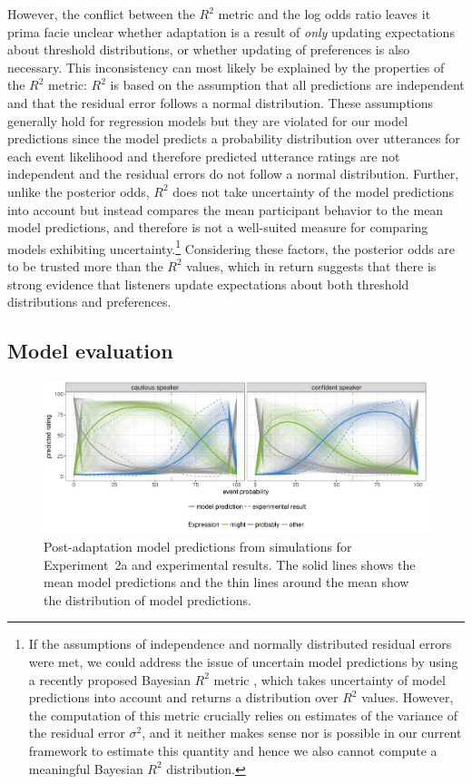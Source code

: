 \documentclass[man, floatsintext]{apa6}
\begin{document}
However, the conflict between the $R^2$ metric and the log odds ratio leaves it prima facie unclear whether adaptation is a result of 
\emph{only} updating expectations about threshold distributions, or whether updating of preferences is also necessary. 
This inconsistency can most likely be explained by the properties of the $R^2$ metric: $R^2$ is based on the assumption that all predictions
are independent and that the residual error follows a normal distribution. These assumptions generally hold for regression models but they are violated
for our model predictions since the model predicts a probability distribution over utterances for each event likelihood and therefore predicted utterance
ratings are not independent and the residual errors do not follow a normal distribution. Further, unlike the posterior odds,
$R^2$ does not take uncertainty of the model predictions into account but instead compares the mean participant behavior to the mean 
model predictions, and therefore is not a well-suited measure for comparing models exhibiting uncertainty.\footnote{If the assumptions of independence and normally distributed 
residual errors were met, we could address the issue of uncertain model predictions by using a recently proposed Bayesian $R^2$ metric \parencite{Gelman2019}, 
which takes uncertainty of model predictions into account and returns a distribution over $R^2$ values. 
However, the computation of this metric crucially relies on estimates of the variance of the residual error $\sigma^2$, and it neither makes sense nor is possible in our current framework to estimate this quantity and hence we also cannot compute a meaningful Bayesian $R^2$ distribution.} Considering these factors, the posterior odds are to be trusted more than the $R^2$ values, which in return 
suggests that there is strong evidence that listeners  update expectations about both {threshold distributions} and {preferences}. 



\subsection{Model evaluation}

\begin{figure}
  \includegraphics[width=\textwidth]{plots/adaptation-posterior-predictions.pdf}
  \caption{Post-adaptation model predictions from simulations for Experiment~2a and experimental results. 
  The solid lines shows the mean model predictions and the thin lines around the mean show the distribution of model predictions. \label{fig:post-exposure-model}}
\end{figure}
\end{document}
